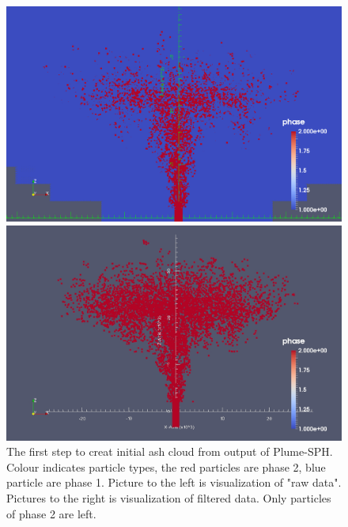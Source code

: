 \begin{figure}
\center
    \begin{minipage}{.325 \textwidth}
        \centering
        \includegraphics[width=0.99 \textwidth]{Chapter-7/Figures/cut_view_ptype}
    \end{minipage}%
    \begin{minipage}{.325 \textwidth}
        \centering
        \includegraphics[width=0.99 \textwidth]{Chapter-7/Figures/cut_view_ptype_filtered}
    \end{minipage}%
    \caption{The first step to creat initial ash cloud from output of Plume-SPH. Colour indicates particle types, the red particles are phase 2, blue particle are phase 1. Picture to the left is visualization of "raw data". Pictures to the right is visualization of filtered data. Only particles of phase 2 are left.}
    \label{fig:Plume-SPH-filter-phase}
\end{figure}


